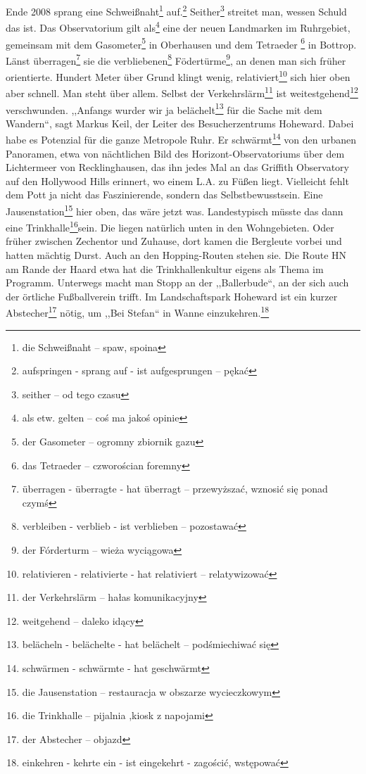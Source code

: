 \documentclass[twoside]{article}
\begin{document}
\begin{multicols}{2}
 Ende 2008 sprang eine Schwei{\ss}naht\footnote{die Schwei{\ss}naht -- spaw, spoina} auf.\footnote{aufspringen - sprang auf - ist aufgesprungen -- p\k{e}ka\'c}
 Seither\footnote{seither -- od tego czasu}  streitet man, wessen Schuld das ist. Das Observatorium gilt als\footnote{als etw. gelten -- co\'s ma jako\'s opinie}
 eine der neuen Landmarken im Ruhrgebiet, gemeinsam mit dem Gasometer\footnote{der Gasometer -- ogromny zbiornik gazu} in Oberhausen und dem Tetraeder
 \footnote{das Tetraeder -- czworo\'scian foremny} in Bottrop. L\"anst \"uberragen\footnote{\"uberragen - \"uberragte - hat \"uberragt -- przewy\.zsza\'c, wznosi\'c si\k{e} ponad
 czym\'s} sie die verbliebenen\footnote{verbleiben - verblieb - ist verblieben -- pozostawa\'c} F\"odert\"urme\footnote{der F\'orderturm -- wie\.za wyci\k{a}gowa}, an denen man sich
 fr\"uher orientierte. Hundert Meter \"uber Grund klingt wenig, relativiert\footnote{relativieren - relativierte - hat relativiert -- relatywizowa\'c} sich hier oben aber schnell.
 Man steht \"uber allem. Selbst der Verkehrsl\"arm\footnote{der Verkehrsl\"arm -- ha\l{}as komunikacyjny}
 ist weitestgehend\footnote{weitgehend -- daleko id\k{a}cy} verschwunden. ,,Anfangs wurder wir ja bel\"achelt\footnote{bel\"acheln - bel\"achelte - hat bel\"achelt -- pod\'smiechiwa\'c
 si\k{e}} f\"ur die Sache mit dem Wandern``, sagt Markus Keil, der Leiter des Besucherzentrums
 Hoheward. Dabei habe es Potenzial f\"ur die ganze Metropole Ruhr. Er schw\"armt\footnote{schw\"armen - schw\"armte - hat geschw\"armt}
 von den urbanen Panoramen, etwa von n\"achtlichen Bild des Horizont-Observatoriums
 \"uber dem Lichtermeer von Recklinghausen, das ihn jedes Mal an das Griffith Observatory auf den Hollywood Hills erinnert, wo einem L.A. zu F\"u{\ss}en liegt.
 Vielleicht fehlt dem Pott ja nicht das Faszinierende, sondern das Selbstbewusstsein. Eine Jausenstation\footnote{die Jausenstation -- restauracja w obszarze wycieczkowym}
 hier oben, das w\"are jetzt was. Landestypisch m\"usste das dann eine Trinkhalle\footnote{die Trinkhalle -- pijalnia ,kiosk z napojami}sein.
 Die liegen nat\"urlich unten in den Wohngebieten. Oder fr\"uher zwischen Zechentor und Zuhause, dort kamen die Bergleute vorbei
 und hatten m\"achtig Durst. Auch an den Hopping-Routen stehen sie. Die Route HN am Rande der Haard etwa hat die Trinkhallenkultur eigens als Thema im Programm.
 Unterwegs macht man Stopp an der ,,Ballerbude``, an der sich auch der \"ortliche Fu{\ss}ballverein trifft. Im Landschaftspark Hoheward ist ein kurzer
 Abstecher\footnote{der Abstecher -- objazd} n\"otig, um ,,Bei Stefan`` in Wanne einzukehren.\footnote{einkehren - kehrte ein - ist eingekehrt - zago\'sci\'c, wst\k{e}powa\'c}

\end{multicols}
\end{document}
